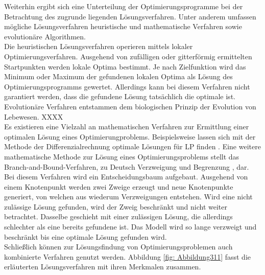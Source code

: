 Weiterhin ergibt sich eine Unterteilung der Optimierungsprogramme bei der Betrachtung des zugrunde liegenden Lösungsverfahren.
Unter anderem umfassen mögliche Lösungsverfahren heuristische und mathematische Verfahren sowie evolutionäre Algorithmen. \cite{Schellong.2016}\\
Die heuristischen Lösungsverfahren operieren mittels lokaler Optimierungsverfahren. 
Ausgehend von zufälligen oder gitterförmig ermittelten Startpunkten werden lokale Optima bestimmt.
Je nach Zielfunktion wird das Minimum oder Maximum der gefundenen lokalen Optima als Lösung des Optimierungsprogramms gewertet.
Allerdings kann bei diesem Verfahren nicht garantiert werden, dass die gefundene Lösung tatsächlich die optimale ist. \cite{Schellong.2016}\\
Evolutionäre Verfahren entstammen dem biologischen Prinzip der Evolution von Lebewesen.
XXXX \cite{Schellong.2016} \\
Es existieren eine Vielzahl an mathematischen Verfahren zur Ermittlung einer optimalen Lösung eines Optimierungproblems. 
Beispielsweise lassen sich mit der Methode der Differenzialrechnung optimale Lösungen für LP finden \cite{Schellong.2016}.
Eine weitere mathematische Methode zur Lösung eines Optimierungsproblems stellt das Branch-and-Bound-Verfahren, zu Deutsch \glqq Verzweigung und Begrenzung \grqq, dar.
Bei diesem Verfahren wird ein Entscheidungsbaum aufgebaut.
Ausgehend von einem Knotenpunkt werden zwei Zweige erzeugt und neue Knotenpunkte generiert, von welchen aus wiederum Verzweigungen entstehen.
Wird eine nicht zulässige Lösung gefunden, wird der Zweig beschränkt und nicht weiter betrachtet.
Dasselbe geschieht mit einer zulässigen Lösung, die allerdings schlechter als eine bereits gefundene ist.
Das Modell wird so lange verzweigt und beschränkt bis eine optimale Lösung gefunden wird.\cite{Dakin.1965} \\
Schließlich können zur Lösungsfindung von Optimierungsproblemen auch kombinierte Verfahren genutzt werden.
Abbildung \ref{fig: Abbildung311} fasst die erläuterten Lösungsverfahren mit ihren Merkmalen zusammen.





